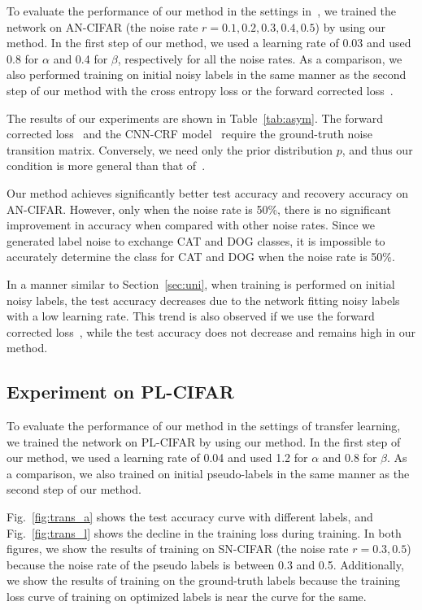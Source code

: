 \documentclass[10pt,twocolumn,letterpaper]{article}
\newcommand{\Tref}[1]{Table~\ref{#1}}
\newcommand{\Fref}[1]{Fig.~\ref{#1}}
\newcommand{\Sref}[1]{Section~\ref{#1}}
\begin{document}
To evaluate the performance of our method in the settings in~\cite{patrini2016making}, we trained the network on AN-CIFAR (the noise rate $r=0.1,0.2,0.3,0.4,0.5$) by using our method.
In the first step of our method, we used a learning rate of 0.03 and used 0.8 for $\alpha$ and 0.4 for $\beta$, respectively for all the noise rates.
As a comparison, we also performed training on initial noisy labels in the same manner as the second step of our method with the cross entropy loss or the forward corrected loss~\cite{patrini2016making}.

The results of our experiments are shown in \Tref{tab:asym}.
The forward corrected loss~\cite{patrini2016making} and the CNN-CRF model~\cite{vahdat2017toward} require the ground-truth noise transition matrix. Conversely, we need only the prior distribution $p$, and thus our condition is more general than that of~\cite{patrini2016making, vahdat2017toward}.

Our method achieves significantly better test accuracy and recovery accuracy on AN-CIFAR.
However, only when the noise rate is 50\%, there is no significant improvement in accuracy when compared with other noise rates. Since we generated label noise to exchange CAT and DOG classes, it is impossible to accurately determine the class for CAT and DOG when the noise rate is 50\%.

In a manner similar to \Sref{sec:uni}, when training is performed on initial noisy labels, the test accuracy decreases due to the network fitting noisy labels with a low learning rate. This trend is also observed if we use the forward corrected loss~\cite{patrini2016making}, while the test accuracy does not decrease and remains high in our method.

\subsection{Experiment on PL-CIFAR}\label{sec:pl}
To evaluate the performance of our method in the settings of transfer learning, we trained the network on PL-CIFAR by using our method. In the first step of our method, we used a learning rate of 0.04 and used 1.2 for $\alpha$ and 0.8 for $\beta$. As a comparison, we also trained on initial pseudo-labels in the same manner as the second step of our method.

\Fref{fig:trans_a} shows the test accuracy curve with different labels, and \Fref{fig:trans_l} shows the decline in the training loss during training. In both figures, we show the results of training on SN-CIFAR (the noise rate $r=0.3,0.5$) because the noise rate of the pseudo labels is between 0.3 and 0.5. Additionally, we show the results of training on the ground-truth labels because the training loss curve of training on optimized labels is near the curve for the same.
\end{document}
